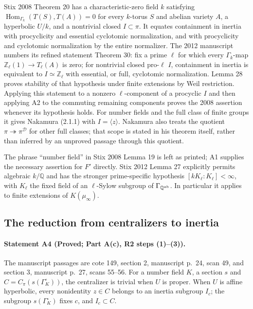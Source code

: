 Stix 2008 Theorem 20 has a characteristic-zero field $k$ satisfying
$\operatorname{Hom}_{\Gamma_k}(T(S),T(A))=0$ for every $k$-torus $S$ and abelian variety $A$, a hyperbolic $U/k$, and a nontrivial closed $I\subset\pi$. It equates containment in inertia with procyclicity and essential cyclotomic normalization, and with procyclicity and cyclotomic normalization by the entire normalizer. The 2012 manuscript numbers its refined statement Theorem 30: fix a prime $\ell$ for which every $\Gamma_k$-map $\mathbb Z_\ell(1)\to T_\ell(A)$ is zero; for nontrivial closed pro-$\ell$ $I$, containment in inertia is equivalent to $I\simeq\mathbb Z_\ell$ with essential, or full, cyclotomic normalization. Lemma 28 proves stability of that hypothesis under finite extensions by Weil restriction. Applying this statement to a nonzero $\ell$-component of a procyclic $I$ and then applying A2 to the commuting remaining components proves the 2008 assertion whenever its hypothesis holds. For number fields and the full class of finite groups it gives Nakamura (2.1.1) with $I=\langle z\rangle$. Nakamura also treats the quotient $\pi\twoheadrightarrow\pi^{\mathcal D}$ for other full classes; that scope is stated in his theorem itself, rather than inferred by an unproved passage through this quotient.

The phrase ``number field'' in Stix 2008 Lemma 19 is left as printed; A1 supplies the necessary assertion for $F'$ directly. Stix 2012 Lemma 27 explicitly permits algebraic $k/\mathbb Q$ and has the stronger prime-specific hypothesis $[kK_\ell:K_\ell]<\infty$, with $K_\ell$ the fixed field of an $\ell$-Sylow subgroup of $\Gamma_{\mathbb Q^{\rm ab}}$. In particular it applies to finite extensions of $K(\mu_\infty)$.

\subsection{The reduction from centralizers to inertia}
\paragraph{Statement A4 (Proved; Part A(c), R2 steps (1)--(3)).}\label{res:A4}
The manuscript passages are cote 149, section 2, manuscript p.~24, scan 49, and section 3, manuscript p.~27, scans 55--56.
For a number field $K$, a section $s$ and $C=C_\pi(s(\Gamma_K^\circ))$, the centralizer is trivial when $U$ is proper. When $U$ is affine hyperbolic, every nonidentity $z\in C$ belongs to an inertia subgroup $I_c$; the subgroup $s(\Gamma_K^\circ)$ fixes $c$, and $I_c\subset C$.

